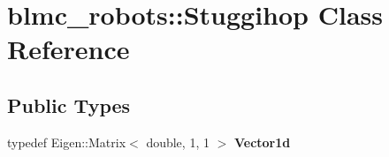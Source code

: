 \hypertarget{classblmc__robots_1_1Stuggihop}{}\section{blmc\+\_\+robots\+:\+:Stuggihop Class Reference}
\label{classblmc__robots_1_1Stuggihop}
\subsection*{Public Types}
\begin{DoxyCompactItemize}
\item 
typedef Eigen\+::\+Matrix$<$ double, 1, 1 $>$ {\bfseries Vector1d}\hypertarget{classblmc__robots_1_1Stuggihop_adbada259f1383ec01148bad4256c2b9f}{}\label{classblmc__robots_1_1Stuggihop_adbada259f1383ec01148bad4256c2b9f}

\end{DoxyCompactItemize}
